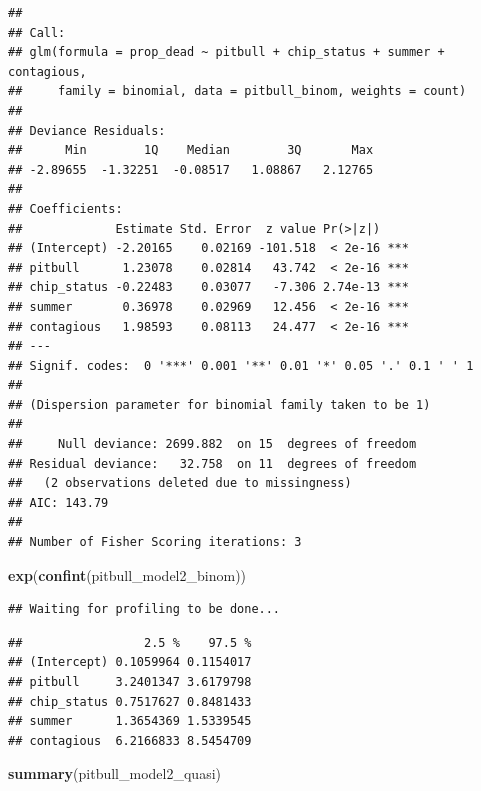 \documentclass[]{article}
\newenvironment{Shaded}{\begin{snugshade}}{\end{snugshade}}
\newcommand{\KeywordTok}[1]{\textcolor[rgb]{0.13,0.29,0.53}{\textbf{#1}}}
\newcommand{\NormalTok}[1]{#1}
\begin{document}
\begin{verbatim}
## 
## Call:
## glm(formula = prop_dead ~ pitbull + chip_status + summer + contagious, 
##     family = binomial, data = pitbull_binom, weights = count)
## 
## Deviance Residuals: 
##      Min        1Q    Median        3Q       Max  
## -2.89655  -1.32251  -0.08517   1.08867   2.12765  
## 
## Coefficients:
##             Estimate Std. Error  z value Pr(>|z|)    
## (Intercept) -2.20165    0.02169 -101.518  < 2e-16 ***
## pitbull      1.23078    0.02814   43.742  < 2e-16 ***
## chip_status -0.22483    0.03077   -7.306 2.74e-13 ***
## summer       0.36978    0.02969   12.456  < 2e-16 ***
## contagious   1.98593    0.08113   24.477  < 2e-16 ***
## ---
## Signif. codes:  0 '***' 0.001 '**' 0.01 '*' 0.05 '.' 0.1 ' ' 1
## 
## (Dispersion parameter for binomial family taken to be 1)
## 
##     Null deviance: 2699.882  on 15  degrees of freedom
## Residual deviance:   32.758  on 11  degrees of freedom
##   (2 observations deleted due to missingness)
## AIC: 143.79
## 
## Number of Fisher Scoring iterations: 3
\end{verbatim}

\begin{Shaded}
\begin{Highlighting}[]
\KeywordTok{exp}\NormalTok{(}\KeywordTok{confint}\NormalTok{(pitbull_model2_binom))}
\end{Highlighting}
\end{Shaded}

\begin{verbatim}
## Waiting for profiling to be done...
\end{verbatim}

\begin{verbatim}
##                 2.5 %    97.5 %
## (Intercept) 0.1059964 0.1154017
## pitbull     3.2401347 3.6179798
## chip_status 0.7517627 0.8481433
## summer      1.3654369 1.5339545
## contagious  6.2166833 8.5454709
\end{verbatim}

\begin{Shaded}
\begin{Highlighting}[]
\KeywordTok{summary}\NormalTok{(pitbull_model2_quasi)}
\end{Highlighting}
\end{Shaded}
\end{document}
